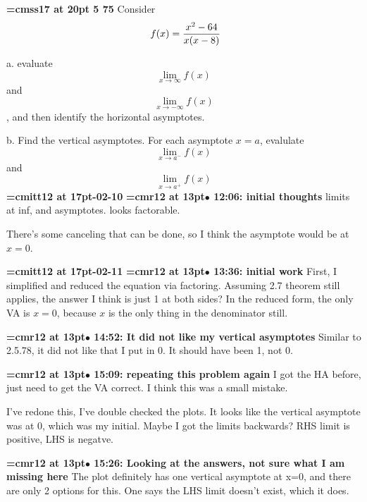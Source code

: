 {\medskip\noindent\bf\font\titlefont=cmss17 at 20pt 5 75}\medskip
Consider
$$\
f(x) = {
x^2 - 64
\over
x(x - 8)
}
$$
\par a. evaluate $$\lim_{x \to \infty}{f(x)}$$ and
$$\lim_{x \to -\infty}{f(x)}$$, and then identify the horizontal
asymptotes.
\par b. Find the vertical asymptotes. For each asymptote $x = a$,
evalulate $$\lim_{x \to a^{-}}{f(x)}$$ and $$\lim_{x \to a^{+}}{f(x)}$$
{\medskip\noindent\bf\font\titlefont=cmitt12 at 17pt\titlefont 2026-02-10}\medskip
{\smallskip\noindent\bf\font\titlefont=cmr12 at 13pt\titlefont $\bullet$ 12:06: initial thoughts}\smallskip
limits at inf, and asymptotes. looks factorable.
\par

There's some canceling that can be done, so I think the asymptote would be at $x = 0$.
\par

{\medskip\noindent\bf\font\titlefont=cmitt12 at 17pt-02-11}\medskip
{\smallskip\noindent\bf\font\titlefont=cmr12 at 13pt\titlefont $\bullet$ 13:36: initial work}\smallskip
First, I simplified and reduced the equation via factoring. Assuming 2.7 theorem still applies, the answer I think is just 1 at both sides? In the reduced form, the only VA is $x = 0$, because $x$ is the only thing in the denominator still.
\par

{\smallskip\noindent\bf\font\titlefont=cmr12 at 13pt\titlefont $\bullet$ 14:52: It did not like my vertical asymptotes}\smallskip
Similar to 2.5.78, it did not like that I put in 0. It should have been 1, not 0.
\par

{\smallskip\noindent\bf\font\titlefont=cmr12 at 13pt\titlefont $\bullet$ 15:09: repeating this problem again}\smallskip
I got the HA before, just need to get the VA correct. I think this was a small mistake.
\par

I've redone this, I've double checked the plots. It looks like the vertical asymptote was at 0, which was my initial. Maybe I got the limits backwards? RHS limit is positive, LHS is negatve.
\par

{\smallskip\noindent\bf\font\titlefont=cmr12 at 13pt\titlefont $\bullet$ 15:26: Looking at the answers, not sure what I am missing here}\smallskip
The plot definitely has one vertical asymptote at x=0, and there are only 2 options for this. One says the LHS limit doesn't exist, which it does.
\par

